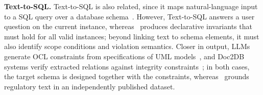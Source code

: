 \smallskip
\noindent\textbf{Text-to-SQL.}
Text-to-SQL is also related, since it maps natural-language input to a SQL query over a database schema~\cite{yu2018spider,picard2021,resdsql2023,pourreza2023din,dail2025,llmTEXT2SQLSurvey2025,redsql2025,XiYanSQL,alrashed2026verification,rabonato2026portuguese}. However, Text-to-SQL answers a user question on the current instance, whereas \system\ produces declarative invariants that must hold for all valid instances; beyond linking text to schema elements, it must also identify scope conditions and violation semantics. Closer in output, LLMs generate OCL constraints from specifications of UML models~\cite{abukhalaf2023ocl,attarwala2026ocl}, and Doc2DB systems verify extracted relations against integrity constraints~\cite{zhang2026doc2db}; in both cases, the target schema is designed together with the constraints, whereas \system\ grounds regulatory text in an independently published dataset.
